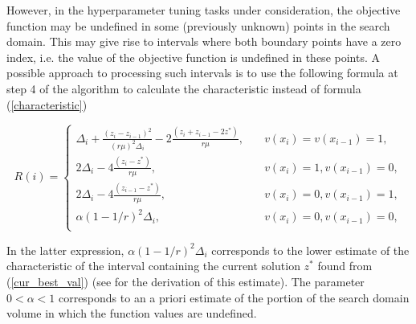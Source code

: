 \documentclass[runningheads]{llncs}
\begin{document}
However, in the hyperparameter tuning tasks under consideration, the objective function may be undefined in some (previously unknown) points in the search domain. This may give rise to intervals where both boundary points have a zero index, i.e. the value of the objective function is undefined in these points. A possible approach to processing such intervals is to use the following formula at step 4 of the algorithm to calculate the characteristic instead of formula (\ref{characteristic})

\begin{equation}\label{characteristic_2}
R(i)=
\begin{cases}
    \Delta_i+\frac{(z_i-z_{i-1})^2}{(r\mu)^2\Delta_i} - 2 \frac{(z_i+z_{i-1}-2z^*)}{r\mu},   & \quad v(x_i)=v(x_{i-1})=1,\\
    2\Delta_i- 4 \frac{(z_i-z^*)}{r\mu},   & \quad v(x_i)=1, v(x_{i-1})=0,\\
    2\Delta_i- 4 \frac{(z_{i-1}-z^*)}{r\mu},       & \quad v(x_i)=0, v(x_{i-1})=1,\\
    \alpha(1-1/r)^2\Delta_i,       & \quad v(x_i)=0, v(x_{i-1})=0,\\
\end{cases}
\end{equation}

In the latter expression, $\alpha(1-1/r)^2\Delta_i$ corresponds to the lower estimate of the characteristic of the interval containing the current solution $z^*$ found from (\ref{cur_best_val}) (see \cite{Strongin2020} for the derivation of this estimate). The parameter $0<\alpha<1$ corresponds to an a priori estimate of the portion of the search domain volume in which the function values are undefined.  
\end{document}
